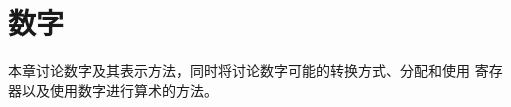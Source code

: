\documentclass{book}
\begin{document}
\chapter{数字}\label{number}

本章讨论数字及其表示方法，同时将讨论数字可能的转换方式、分配和使用  寄存器以及使用数字进行算术的方法。

\label{cschap:number}\label{cschap:romannumeral}\label{cschap:count}\label{cschap:countdef}\label{cschap:newcount}\label{cschap:advance}\label{cschap:multiply}\label{cschap:divide}
\end{document}
